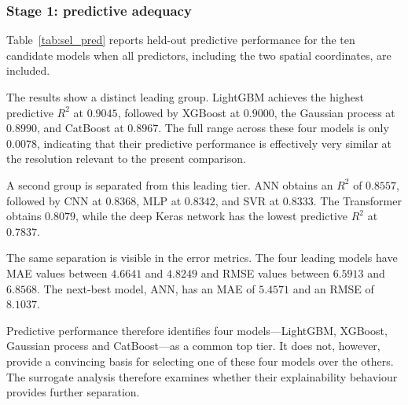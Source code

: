 \subsubsection{Stage 1: predictive adequacy}
\label{sec}

Table~\ref{tab:sel_pred} reports held-out predictive performance for the ten candidate models when all predictors, including the two spatial coordinates, are included.

The results show a distinct leading group. LightGBM achieves the highest predictive $R^2$ at $0.9045$, followed by XGBoost at $0.9000$, the Gaussian process at $0.8990$, and CatBoost at $0.8967$. The full range across these four models is only $0.0078$, indicating that their predictive performance is effectively very similar at the resolution relevant to the present comparison.

A second group is separated from this leading tier. ANN obtains an $R^2$ of $0.8557$, followed by CNN at $0.8368$, MLP at $0.8342$, and SVR at $0.8333$. The Transformer obtains $0.8079$, while the deep Keras network has the lowest predictive $R^2$ at $0.7837$.

The same separation is visible in the error metrics. The four leading models have MAE values between $4.6641$ and $4.8249$ and RMSE values between $6.5913$ and $6.8568$. The next-best model, ANN, has an MAE of $5.4571$ and an RMSE of $8.1037$.

Predictive performance therefore identifies four models---LightGBM, XGBoost, Gaussian process and CatBoost---as a common top tier. It does not, however, provide a convincing basis for selecting one of these four models over the others. The surrogate analysis therefore examines whether their explainability behaviour provides further separation.

